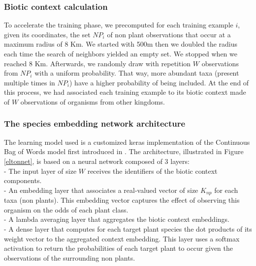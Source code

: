 \documentclass[]{article}
\begin{document}
\subsubsection{Biotic context calculation}
To accelerate the training phase, we precomputed for each training example $i$, given its coordinates, the set $NP_i$ of non plant observations that occur at a maximum radius of 8 Km. We started with 500m then we doubled the radius each time the search of neighbors yielded an empty set. We stopped when we reached 8 Km. Afterwards, we randomly draw with repetition $W$ observations from $NP_i$ with a uniform probability. That way, more abundant taxa (present multiple times in $NP_i$) have a higher probability of being included. At the end of this process, we had associated each training example to its biotic context made of $W$ observations of organisms from other kingdoms.   

\subsubsection{The species embedding network architecture}
The learning model used is a customized keras implementation of the Continuous Bag of Words model first introduced in \cite{mikolov2013efficient}. The architecture, illustrated in Figure \ref{eltonnet}, is based on a neural network composed of 3 layers:\\

\noindent- The input layer of size $W$ receives the identifiers of the biotic context components.\\
- An embedding layer that associates a real-valued vector of size $K_{np}$ for each taxa (non plants). This embedding vector captures the effect of observing this organism on the odds of each plant class. \\
- A lambda averaging layer that aggregates the biotic context embeddings. \\
- A dense layer that computes for each target plant species the dot products of its weight vector to the aggregated context embedding. This layer uses a softmax activation to return the probabilities of each target plant to occur given the observations of the surrounding non plants. \\
\end{document}
